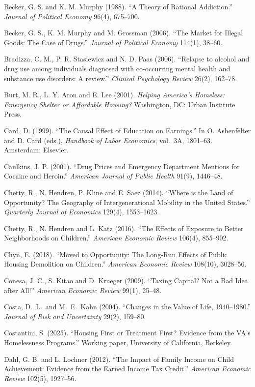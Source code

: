 \documentclass[10pt]{article}
\begin{document}
{\begin{list}{}{\setlength{\leftmargin}{1.5em}\setlength{\itemindent}{-1.5em}\setlength{\itemsep}{0.35em}\setlength{\parsep}{0em}}
\item Becker, G. S. and K. M. Murphy (1988). ``A Theory of Rational Addiction.'' \emph{Journal of Political Economy} 96(4), 675--700.
\item Becker, G. S., K. M. Murphy and M. Grossman (2006). ``The Market for Illegal Goods: The Case of Drugs.'' \emph{Journal of Political Economy} 114(1), 38--60.
\item Bradizza, C. M., P. R. Stasiewicz and N. D. Paas (2006). ``Relapse to alcohol and drug use among individuals diagnosed with co-occurring mental health and substance use disorders: A review.'' \emph{Clinical Psychology Review} 26(2), 162--78.
\item Burt, M. R., L. Y. Aron and E. Lee (2001). \emph{Helping America's Homeless: Emergency Shelter or Affordable Housing?} Washington, DC: Urban Institute Press.
\item Card, D. (1999). ``The Causal Effect of Education on Earnings.'' In O. Ashenfelter and D. Card (eds.), \emph{Handbook of Labor Economics}, vol.\ 3A, 1801--63. Amsterdam: Elsevier.
\item Caulkins, J. P. (2001). ``Drug Prices and Emergency Department Mentions for Cocaine and Heroin.'' \emph{American Journal of Public Health} 91(9), 1446--48.
\item Chetty, R., N. Hendren, P. Kline and E. Saez (2014). ``Where is the Land of Opportunity? The Geography of Intergenerational Mobility in the United States.'' \emph{Quarterly Journal of Economics} 129(4), 1553--1623.
\item Chetty, R., N. Hendren and L. Katz (2016). ``The Effects of Exposure to Better Neighborhoods on Children.'' \emph{American Economic Review} 106(4), 855--902.
\item Chyn, E. (2018). ``Moved to Opportunity: The Long-Run Effects of Public Housing Demolition on Children.'' \emph{American Economic Review} 108(10), 3028--56.
\item Conesa, J. C., S. Kitao and D. Krueger (2009). ``Taxing Capital? Not a Bad Idea after All!'' \emph{American Economic Review} 99(1), 25--48.
\item Costa, D.\ L.\ and M.\ E.\ Kahn (2004). ``Changes in the Value of Life, 1940--1980.'' \emph{Journal of Risk and Uncertainty} 29(2), 159--80.
\item Costantini, S. (2025). ``Housing First or Treatment First? Evidence from the VA's Homelessness Programs.'' Working paper, University of California, Berkeley.
\item Dahl, G. B. and L. Lochner (2012). ``The Impact of Family Income on Child Achievement: Evidence from the Earned Income Tax Credit.'' \emph{American Economic Review} 102(5), 1927--56.

\end{list}}
\end{document}
